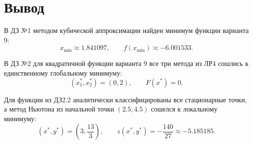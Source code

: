 \documentclass[12pt,a4paper]{article}
\begin{document}
\section{Вывод}

В ДЗ №1 методом кубической аппроксимации найден минимум функции варианта 9:
\[
  x_{\min}\approx 1.841097, \qquad f(x_{\min})\approx -6.001533.
\]

В ДЗ №2 для квадратичной функции варианта 9 все три метода из ЛР4 сошлись к единственному глобальному минимуму:
\[
  (x_1^*,x_2^*)=(0,2), \qquad F(x^*)=0.
\]

Для функции из ДЗ2.2 аналитически классифицированы все стационарные точки, а метод Ньютона из начальной точки $(2.5,4.5)$ сошелся к локальному минимуму:
\[
  (x^*,y^*)=\left(3,\frac{13}{3}\right), \qquad z(x^*,y^*)=-\frac{140}{27}\approx -5.185185.
\]
\end{document}
